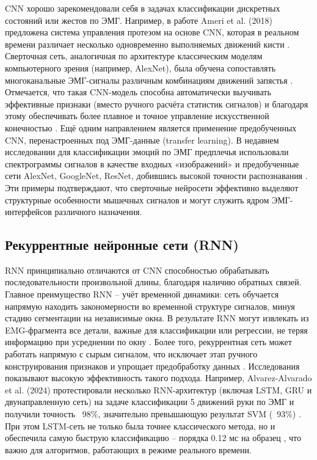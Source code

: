 \documentclass[12pt,a4paper]{article}
\begin{document}
CNN хорошо зарекомендовали себя в задачах классификации дискретных состояний или жестов по ЭМГ. Например, в работе Ameri et al. (2018) предложена система управления протезом на основе CNN, которая в реальном времени различает несколько одновременно выполняемых движений кисти \cite{15}. Сверточная сеть, аналогичная по архитектуре классическим моделям компьютерного зрения (например, AlexNet), была обучена сопоставлять многоканальные ЭМГ-сигналы различным комбинациям движений запястья \cite{16}. Отмечается, что такая CNN-модель способна автоматически выучивать эффективные признаки (вместо ручного расчёта статистик сигналов) и благодаря этому обеспечивать более плавное и точное управление искусственной конечностью \cite{15}. Ещё одним направлением является применение предобученных CNN, перенастроенных под ЭМГ-данные (transfer learning). В недавнем исследовании для классификации эмоций по ЭМГ предплечья использовали спектрограммы сигналов в качестве входных «изображений» и предобученные сети AlexNet, GoogleNet, ResNet, добившись высокой точности распознавания \cite{17}. Эти примеры подтверждают, что сверточные нейросети эффективно выделяют структурные особенности мышечных сигналов и могут служить ядром ЭМГ-интерфейсов различного назначения.






\subsection{Рекуррентные нейронные сети (RNN)}
 RNN принципиально отличаются от CNN способностью обрабатывать последовательности произвольной длины, благодаря наличию обратных связей. Главное преимущество RNN – учёт временной динамики: сеть обучается напрямую находить закономерности во временной структуре сигналов, минуя стадию сегментации на независимые окна. В результате RNN могут извлекать из EMG-фрагмента все детали, важные для классификации или регрессии, не теряя информацию при усреднении по окну \cite{18}. Более того, рекуррентная сеть может работать напрямую с сырым сигналом, что исключает этап ручного конструирования признаков и упрощает предобработку данных \cite{19}. Исследования показывают высокую эффективность такого подхода. Например, Alvarez-Alvarado et al. (2024) протестировали несколько RNN-архитектур (включая LSTM, GRU и двунаправленную сеть) на задаче классификации 5 движений руки по ЭМГ и получили точность ~98\%, значительно превышающую результат SVM (~93\%) \cite{20}. При этом LSTM-сеть не только была точнее классического метода, но и обеспечила самую быструю классификацию – порядка 0.12 мс на образец \cite{20}, что важно для алгоритмов, работающих в режиме реального времени.
\end{document}
